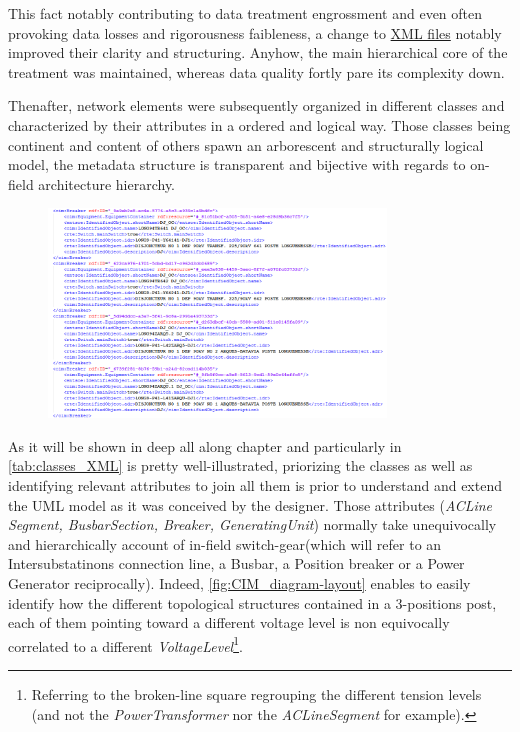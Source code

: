 This fact  notably contributing to data treatment engrossment and even often provoking data losses and rigorousness faibleness, a change to \hyperref[fig:XMLformat]{XML files} notably improved their clarity and structuring. Anyhow, the main hierarchical core of the treatment was maintained, whereas data quality fortly pare its complexity down. 

Thenafter, network elements were subsequently organized in different classes and characterized by their attributes in a ordered and logical way. Those classes being continent and content of others spawn an arborescent and structurally logical model, the metadata structure is transparent and bijective with regards to on-field architecture hierarchy.

\begin{figure}[h!]
    \centering
    \parbox[t]{0.8\textwidth}{
    \href{}{\includegraphics[width=0.8\textwidth]{0.figuras/XML_database_format.png}}
    \label{fig:XMLformat}}
\end{figure}

As it will be shown in deep all along  chapter and particularly in \autoref{tab:classes_XML} is pretty well-illustrated, priorizing the classes as well as identifying relevant attributes to join all them is prior to understand and extend the UML model as it was conceived by the designer\cite{CIMIntelliGrid}. Those attributes (\textit{ACLine Segment, BusbarSection, Breaker, GeneratingUnit}) normally take unequivocally and hierarchically account of in-field switch-gear(which  will refer to an Intersubstatinons connection line, a Busbar, a Position breaker or a Power Generator reciprocally). Indeed, \autoref{fig:CIM_diagram-layout} enables to easily identify how the different topological structures contained in a 3-positions post, each of them pointing toward a different voltage level is non equivocally correlated to a different \textit{VoltageLevel}\footnote{Referring to the broken-line square regrouping the different tension levels (and not the \textit{PowerTransformer} nor the \textit{ACLineSegment} for example).}.

